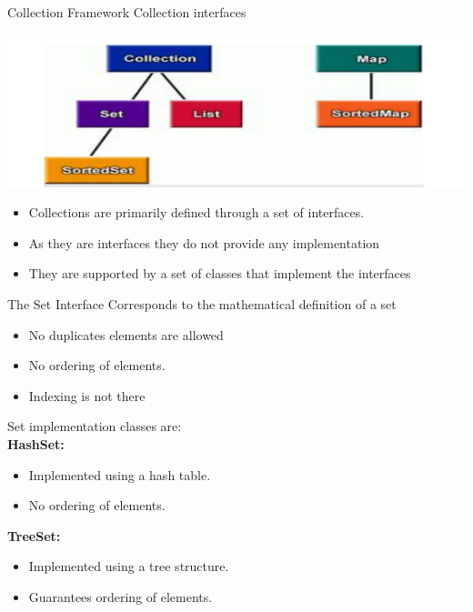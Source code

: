 \documentclass[14pt]{beamer}
\begin{document}
\begin{frame}{Collection Framework}
Collection interfaces
\begin{center}
    \includegraphics[scale=0.5]{COJ-M04-S01-Image1.png}
  \end{center}
\begin{itemize}
\item Collections are primarily defined through a set of interfaces.
\item As they are interfaces they do not provide any implementation
\item They are supported by a set of classes that implement the interfaces
\end{itemize}
\end{frame}

\begin{frame}{The Set Interface}
Corresponds to the mathematical definition of a set 
\begin{itemize}
\item No duplicates elements are allowed
\item No ordering of elements.
\item Indexing is not there
\end{itemize}
Set implementation classes are: \\
\textbf{HashSet:}
\begin{itemize}
\item Implemented using a hash table.
\item No ordering of elements.
\end{itemize}

\textbf{TreeSet:}
\begin{itemize}
\item Implemented using a tree structure.
\item Guarantees ordering of elements.
\end{itemize}
\end{frame}
\end{document}
